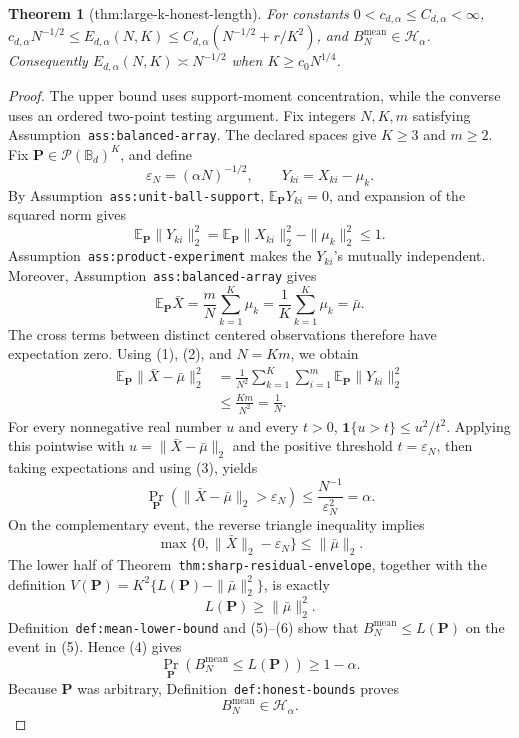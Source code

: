 \documentclass{article}
\newtheorem{theorem}{Theorem}
\begin{document}
\begin{theorem}[thm:large-k-honest-length]\label{thm:large-k-honest-length}
For constants \(0<c_{d,\alpha}\le C_{d,\alpha}<\infty\), \(c_{d,\alpha}N^{-1/2}\le E_{d,\alpha}(N,K)\le C_{d,\alpha}(N^{-1/2}+r/K^2)\), and \(B_N^{\mathrm{mean}}\in\mathcal H_\alpha\). Consequently \(E_{d,\alpha}(N,K)\asymp N^{-1/2}\) when \(K\ge c_0N^{1/4}\).
\end{theorem}
\begin{proof}
The upper bound uses support-moment concentration, while the converse uses an ordered two-point testing argument. Fix integers \(N,K,m\) satisfying Assumption~\texttt{ass:balanced-array}. The declared spaces give \(K\geq 3\) and \(m\geq 2\). Fix \(\mathbf P\in\mathcal P(\mathbb B_d)^K\), and define
\[
\varepsilon_N=(\alpha N)^{-1/2},
\qquad
Y_{ki}=X_{ki}-\mu_k.
\]
By Assumption~\texttt{ass:unit-ball-support}, \(\mathbb E_{\mathbf P}Y_{ki}=0\), and expansion of the squared norm gives
\[
\mathbb E_{\mathbf P}\|Y_{ki}\|_2^2
=\mathbb E_{\mathbf P}\|X_{ki}\|_2^2-\|\mu_k\|_2^2
\leq 1. \tag{1}
\]
Assumption~\texttt{ass:product-experiment} makes the \(Y_{ki}\)'s mutually independent. Moreover, Assumption~\texttt{ass:balanced-array} gives
\[
\mathbb E_{\mathbf P}\bar X
=\frac{m}{N}\sum_{k=1}^K\mu_k
=\frac1K\sum_{k=1}^K\mu_k
=\bar\mu. \tag{2}
\]
The cross terms between distinct centered observations therefore have expectation zero. Using (1), (2), and \(N=Km\), we obtain
\[
\begin{aligned}
\mathbb E_{\mathbf P}\|\bar X-\bar\mu\|_2^2
&=\frac1{N^2}\sum_{k=1}^K\sum_{i=1}^m
  \mathbb E_{\mathbf P}\|Y_{ki}\|_2^2\\
&\leq \frac{Km}{N^2}
=\frac1N. \tag{3}
\end{aligned}
\]
For every nonnegative real number \(u\) and every \(t>0\), \(\mathbf 1\{u>t\}\leq u^2/t^2\). Applying this pointwise with \(u=\|\bar X-\bar\mu\|_2\) and the positive threshold \(t=\varepsilon_N\), then taking expectations and using (3), yields
\[
\Pr_{\mathbf P}\!\left(\|\bar X-\bar\mu\|_2>\varepsilon_N\right)
\leq \frac{N^{-1}}{\varepsilon_N^2}
=\alpha. \tag{4}
\]
On the complementary event, the reverse triangle inequality implies
\[
\max\{0,\|\bar X\|_2-\varepsilon_N\}
\leq \|\bar\mu\|_2. \tag{5}
\]
The lower half of Theorem~\texttt{thm:sharp-residual-envelope}, together with the definition \(V(\mathbf P)=K^2\{L(\mathbf P)-\|\bar\mu\|_2^2\}\), is exactly
\[
L(\mathbf P)\geq \|\bar\mu\|_2^2. \tag{6}
\]
Definition~\texttt{def:mean-lower-bound} and (5)--(6) show that \(B_N^{\mathrm{mean}}\leq L(\mathbf P)\) on the event in (5). Hence (4) gives
\[
\Pr_{\mathbf P}\!\left(B_N^{\mathrm{mean}}\leq L(\mathbf P)\right)
\geq 1-\alpha. \tag{7}
\]
Because \(\mathbf P\) was arbitrary, Definition~\texttt{def:honest-bounds} proves
\[
B_N^{\mathrm{mean}}\in\mathcal H_\alpha. \tag{8}
\]


\end{proof}
\end{document}
